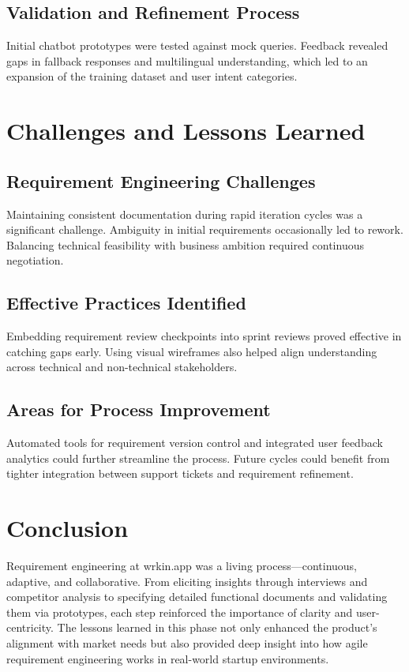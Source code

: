 \subsection{Validation and Refinement Process}

Initial chatbot prototypes were tested against mock queries. Feedback revealed gaps in fallback responses and multilingual understanding, which led to an expansion of the training dataset and user intent categories.

\section{Challenges and Lessons Learned}

\subsection{Requirement Engineering Challenges}

Maintaining consistent documentation during rapid iteration cycles was a significant challenge. Ambiguity in initial requirements occasionally led to rework. Balancing technical feasibility with business ambition required continuous negotiation.

\subsection{Effective Practices Identified}

Embedding requirement review checkpoints into sprint reviews proved effective in catching gaps early. Using visual wireframes also helped align understanding across technical and non-technical stakeholders.

\subsection{Areas for Process Improvement}

Automated tools for requirement version control and integrated user feedback analytics could further streamline the process. Future cycles could benefit from tighter integration between support tickets and requirement refinement.

\section{Conclusion}

Requirement engineering at wrkin.app was a living process—continuous, adaptive, and collaborative. From eliciting insights through interviews and competitor analysis to specifying detailed functional documents and validating them via prototypes, each step reinforced the importance of clarity and user-centricity. The lessons learned in this phase not only enhanced the product’s alignment with market needs but also provided deep insight into how agile requirement engineering works in real-world startup environments.
